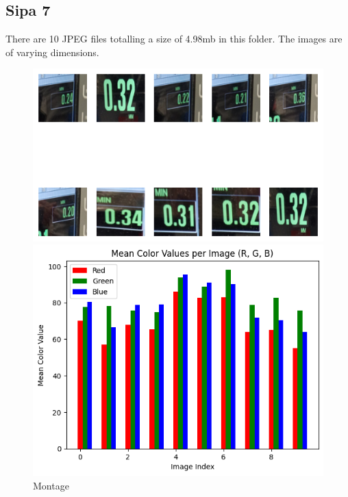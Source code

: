

\subsection{Sipa 7}

There are 10 JPEG files totalling a size of 4.98mb in this folder. The images are of varying dimensions.


\begin{figure}[ht]
    \centering
    \begin{minipage}[t]{0.25\textwidth}
        \centering
        \includegraphics[width=\textwidth]{Figures/EDA_Charts/7/montage.png}
        \caption*{Montage}
    \end{minipage}\hfill
    \begin{minipage}[t]{0.25\textwidth}
        \centering
        \includegraphics[width=\textwidth]{Figures/EDA_Charts/7/rgb.png}

\end{minipage}
\end{figure}
